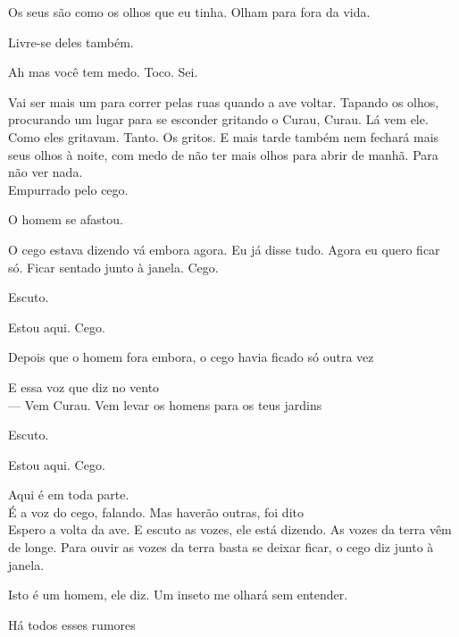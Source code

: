 Os seus são como os olhos que eu tinha. Olham para fora da vida.

Livre-se deles também.

Ah mas você tem medo. Toco. Sei.

Vai ser mais um para correr pelas ruas quando a ave voltar. Tapando os
olhos, procurando um lugar para se esconder gritando o Curau, Curau. Lá
vem ele. Como eles gritavam. Tanto. Os gritos. E mais tarde também nem
fechará mais seus olhos à noite, com medo de não ter mais olhos para
abrir de manhã. Para não ver nada.\\

Empurrado pelo cego.

O homem se afastou.

O cego estava dizendo vá embora agora. Eu já disse tudo. Agora eu quero
ficar só. Ficar sentado junto à janela. Cego.

\breakk

\vspace*{4cm}

Escuto.

Estou aqui. Cego.

\breakk

\vspace*{4cm}

Depois que o homem fora embora, o cego havia ficado só outra vez

\breakk

\vspace*{4cm}

E essa voz que diz no vento\\

--- Vem Curau. Vem levar os homens para os teus jardins

\breakk

\vspace*{4cm}

Escuto.

Estou aqui. Cego.

Aqui é em toda parte.\\

É a voz do cego, falando. Mas haverão outras, foi dito\\

Espero a volta da ave. E escuto as vozes, ele está dizendo. As vozes da
terra vêm de longe. Para ouvir as vozes da terra basta se deixar ficar,
o cego diz junto à janela.

Isto é um homem, ele diz. Um inseto me olhará sem entender.

Há todos esses rumores\\

